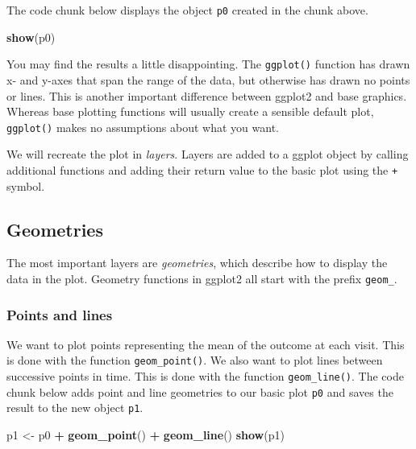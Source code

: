 \documentclass[
]{book}
\newenvironment{Shaded}{\begin{snugshade}}{\end{snugshade}}
\newcommand{\FunctionTok}[1]{\textcolor[rgb]{0.13,0.29,0.53}{\textbf{#1}}}
\newcommand{\NormalTok}[1]{#1}
\newcommand{\OtherTok}[1]{\textcolor[rgb]{0.56,0.35,0.01}{#1}}
\newcommand{\SpecialCharTok}[1]{\textcolor[rgb]{0.81,0.36,0.00}{\textbf{#1}}}
\begin{document}
The code chunk below displays the object \texttt{p0} created in the chunk above.

\begin{Shaded}
\begin{Highlighting}[]
\FunctionTok{show}\NormalTok{(p0)}
\end{Highlighting}
\end{Shaded}

You may find the results a little disappointing. The \texttt{ggplot()} function has drawn x- and y-axes that span the range of the data, but otherwise has drawn no points or lines. This is another important difference between ggplot2 and base graphics. Whereas base plotting functions will usually create a sensible default plot, \texttt{ggplot()} makes no assumptions about what you want.

We will recreate the plot in \emph{layers}. Layers are added to a ggplot object by calling additional functions and adding their return value to the basic plot using the \texttt{+} symbol.

\subsection{Geometries}\label{geometries}

The most important layers are \emph{geometries}, which describe how to display the data in the plot. Geometry functions in ggplot2 all start with the prefix \texttt{geom\_}.

\subsubsection{Points and lines}\label{points-and-lines}

We want to plot points representing the mean of the outcome at each visit. This is done with the function \texttt{geom\_point()}. We also want to plot lines between successive points in time. This is done with the function \texttt{geom\_line()}. The code chunk below adds point and line geometries to our basic plot \texttt{p0} and saves the result to the new object \texttt{p1}.

\begin{Shaded}
\begin{Highlighting}[]
\NormalTok{p1 }\OtherTok{\textless{}{-}}\NormalTok{ p0 }\SpecialCharTok{+} \FunctionTok{geom\_point}\NormalTok{() }\SpecialCharTok{+} \FunctionTok{geom\_line}\NormalTok{()}
\FunctionTok{show}\NormalTok{(p1)}
\end{Highlighting}
\end{Shaded}
\end{document}
